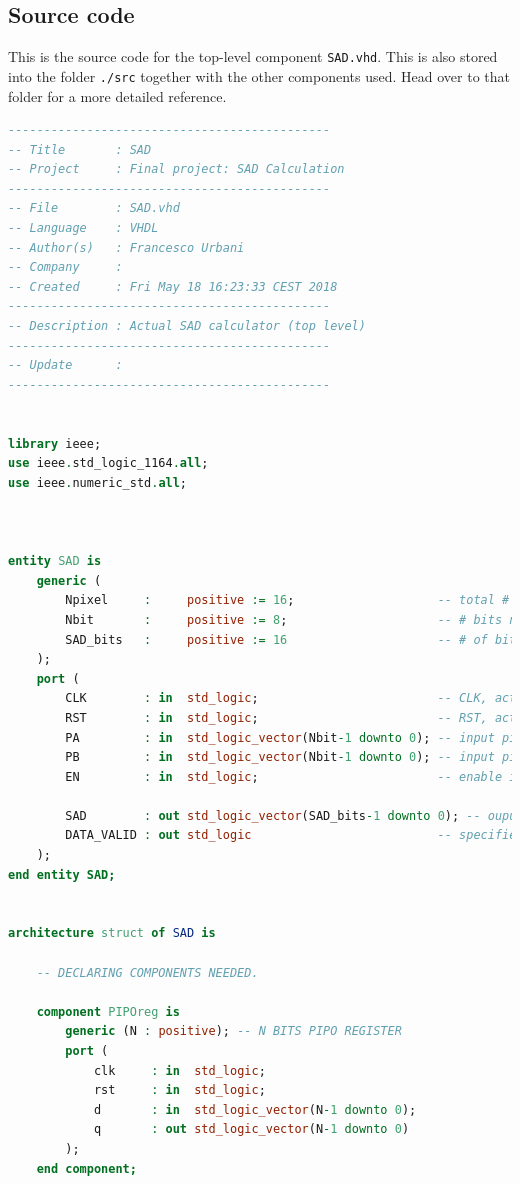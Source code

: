 \documentclass[12pt, a4paper]{article}
\begin{document}
\begin{appendices}

\section{Source code}\label{appendix:code}

This is the source code for the top-level component \texttt{SAD.vhd}. This is also stored into the folder \texttt{./src} together with the other components used. Head over to that folder for a more detailed reference.


\begin{lstlisting}[language=vhdl]
---------------------------------------------
-- Title       : SAD
-- Project     : Final project: SAD Calculation
---------------------------------------------
-- File        : SAD.vhd
-- Language    : VHDL
-- Author(s)   : Francesco Urbani
-- Company     : 
-- Created     : Fri May 18 16:23:33 CEST 2018
---------------------------------------------
-- Description : Actual SAD calculator (top level)
---------------------------------------------
-- Update      : 
---------------------------------------------


library ieee;
use ieee.std_logic_1164.all;
use ieee.numeric_std.all;



entity SAD is
	generic (
		Npixel     :     positive := 16;                    -- total # of pixels of the image
		Nbit       :     positive := 8;                     -- # bits needed to represent the value of each pixel
		SAD_bits   :     positive := 16                     -- # of bits needed to represent the output
	);
	port (
		CLK        : in  std_logic;	                        -- CLK, active on rising edge
		RST        : in  std_logic;	                        -- RST, active high
		PA         : in  std_logic_vector(Nbit-1 downto 0);	-- input pixel value image A
		PB         : in  std_logic_vector(Nbit-1 downto 0);	-- input pixel value image B
		EN         : in  std_logic;	                        -- enable input

		SAD        : out std_logic_vector(SAD_bits-1 downto 0);	-- ouput SAD value
		DATA_VALID : out std_logic	                        -- specifies whether the output SAD is valid or not
	);
end entity SAD;


architecture struct of SAD is
	
	-- DECLARING COMPONENTS NEEDED.

	component PIPOreg is
		generic (N : positive); -- N BITS PIPO REGISTER
		port (
			clk     : in  std_logic;
			rst     : in  std_logic;
			d       : in  std_logic_vector(N-1 downto 0);
			q       : out std_logic_vector(N-1 downto 0)
		);
	end component;


\end{lstlisting}
\end{appendices}
\end{document}
